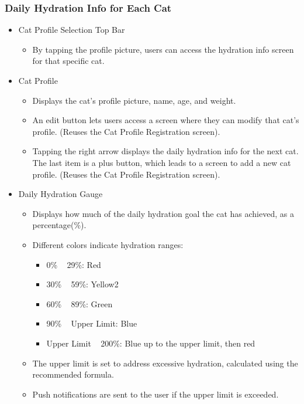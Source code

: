 \documentclass[conference]{IEEEtran}
\begin{document}
\subsubsection{Daily Hydration Info for Each Cat}
\begin{itemize}
    \item Cat Profile Selection Top Bar
    \begin{itemize}
        \item By tapping the profile picture, users can access the hydration info screen for that specific cat.
    \end{itemize}
    \item Cat Profile
    \begin{itemize}
        \item Displays the cat's profile picture, name, age, and weight.
        \item An edit button lets users access a screen where they can modify that cat's profile. (Reuses the Cat Profile Registration screen).
        \item Tapping the right arrow displays the daily hydration info for the next cat. The last item is a plus button, which leads to a screen to add a new cat profile. (Reuses the Cat Profile Registration screen).
    \end{itemize}
    \item Daily Hydration Gauge
    \begin{itemize}
        \item Displays how much of the daily hydration goal the cat has achieved, as a percentage(\%).
        \item Different colors indicate hydration ranges:
        \begin{itemize}
            \item 0\% ~ 29\%: Red
            \item 30\% ~ 59\%: Yellow2
            \item 60\% ~ 89\%: Green
            \item 90\% ~ Upper Limit: Blue
            \item Upper Limit ~ 200\%: Blue up to the upper limit, then red
        \end{itemize}
        \item The upper limit is set to address excessive hydration, calculated using the recommended formula.
        \item Push notifications are sent to the user if the upper limit is exceeded.
    \end{itemize}

\end{itemize}
\end{document}
